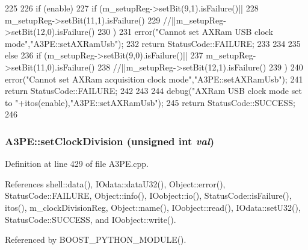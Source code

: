 \begin{DoxyCode}
225                                        {
226   if (enable) {
227       if (m_setupReg->setBit(9,1).isFailure()||
228           m_setupReg->setBit(11,1).isFailure()
229           //||m_setupReg->setBit(12,0).isFailure()
230           ){
231           error("Cannot set AXRam USB clock mode","A3PE::setAXRamUsb");
232           return StatusCode::FAILURE;
233       }
234   }
235   else {
236       if (m_setupReg->setBit(9,0).isFailure()||
237           m_setupReg->setBit(11,0).isFailure()
238           //||m_setupReg->setBit(12,1).isFailure()
239           ){
240         error("Cannot set AXRam acquisition clock mode","A3PE::setAXRamUsb");
241         return StatusCode::FAILURE;
242       }
243   }
244   debug("AXRam USB clock mode set to "+itos(enable),"A3PE::setAXRamUsb");
245   return StatusCode::SUCCESS;
246 }
\end{DoxyCode}
\hypertarget{classA3PE_acf354b2c85a7e20f7f037beb278dd79d}{
\subsubsection[{setClockDivision}]{ A3PE::setClockDivision (unsigned int {\em val})}}
\label{classA3PE_acf354b2c85a7e20f7f037beb278dd79d}


Definition at line 429 of file A3PE.cpp.

References shell::data(), IOdata::dataU32(), Object::error(), StatusCode::FAILURE, Object::info(), IOobject::io(), StatusCode::isFailure(), itos(), m\_\-clockDivisionReg, Object::name(), IOobject::read(), IOdata::setU32(), StatusCode::SUCCESS, and IOobject::write().

Referenced by BOOST\_\-PYTHON\_\-MODULE().


